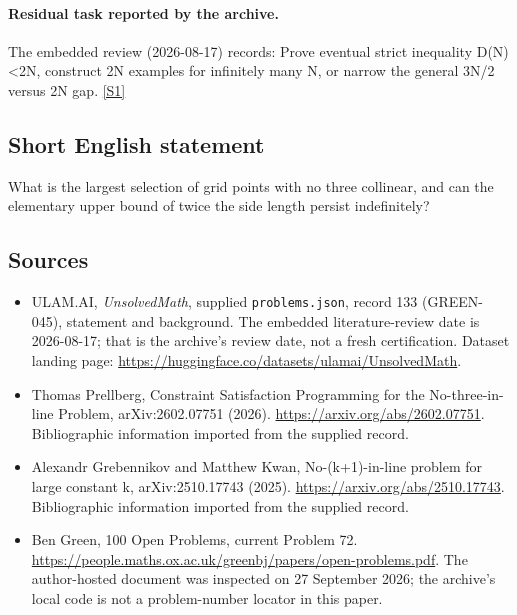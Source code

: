 \documentclass[11pt,a4paper]{article}
\newcommand{\sref}[2]{\hyperlink{source:#1:#2}{[S#2]}}
\begin{document}
\paragraph{Residual task reported by the archive.}

The embedded review (2026-08-17) records: Prove eventual strict inequality D(N)<2N, construct 2N examples for infinitely many N, or narrow the general 3N/2 versus 2N gap. \sref{133}{1}

\subsection{Short English statement}

What is the largest selection of grid points with no three collinear, and can the elementary upper bound of twice the side length persist indefinitely?

\subsection{Sources}

{\small

\begin{itemize}

\item[\hypertarget{source:133:1}{S1}] ULAM.AI, \emph{UnsolvedMath}, supplied \texttt{problems.json}, record 133 (GREEN-045), statement and background. The embedded literature-review date is 2026-08-17; that is the archive’s review date, not a fresh certification. Dataset landing page: \url{https://huggingface.co/datasets/ulamai/UnsolvedMath}.

\item[\hypertarget{source:133:2}{S2}] Thomas Prellberg, Constraint Satisfaction Programming for the No-three-in-line Problem, arXiv:2602.07751 (2026). \url{https://arxiv.org/abs/2602.07751}. Bibliographic information imported from the supplied record.

\item[\hypertarget{source:133:3}{S3}] Alexandr Grebennikov and Matthew Kwan, No-(k+1)-in-line problem for large constant k, arXiv:2510.17743 (2025). \url{https://arxiv.org/abs/2510.17743}. Bibliographic information imported from the supplied record.

\item[\hypertarget{source:133:4}{S4}] Ben Green, 100 Open Problems, current Problem 72. \url{https://people.maths.ox.ac.uk/greenbj/papers/open-problems.pdf}. The author-hosted document was inspected on 27 September 2026; the archive’s local code is not a problem-number locator in this paper.

\end{itemize}

}

\label{end:133}
\end{document}
